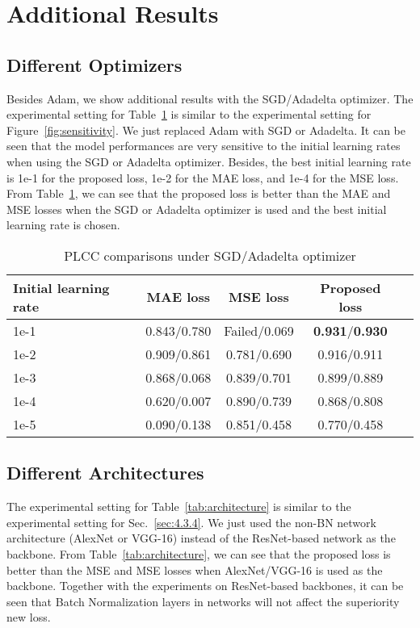\documentclass[sigconf]{acmart}
\begin{document}
\section{Additional Results}

\subsection{Different Optimizers}
Besides Adam, we show additional results with the SGD/Adadelta optimizer.
The experimental setting for Table~\ref{tab:optimizer} is similar to the experimental setting for Figure~\ref{fig:sensitivity}. We just replaced Adam with SGD or Adadelta. It can be seen that the model performances are very sensitive to the initial learning rates when using the SGD or Adadelta optimizer. Besides, the best initial learning rate is 1e-1 for the proposed loss, 1e-2 for the MAE loss, and 1e-4 for the MSE loss.
From Table~\ref{tab:optimizer}, we can see that the proposed loss is better than the MAE and MSE losses when the SGD or Adadelta optimizer is used and the best initial learning rate is chosen. 

\begin{table}[!htb]
\centering
\caption{PLCC comparisons under SGD/Adadelta optimizer}
\label{tab:optimizer}
\begin{tabular}{lcccc}  
\toprule
Initial learning rate & MAE loss & MSE loss & Proposed loss \\
\midrule
1e-1 & 0.843/0.780 & Failed/0.069 & \textbf{0.931}/\textbf{0.930} \\
1e-2 & 0.909/0.861 & 0.781/0.690 & 0.916/0.911 \\
1e-3 & 0.868/0.068 & 0.839/0.701 & 0.899/0.889 \\
1e-4 & 0.620/0.007 & 0.890/0.739 & 0.868/0.808 \\
1e-5 & 0.090/0.138 & 0.851/0.458 & 0.770/0.458 \\
\bottomrule
\end{tabular}
\end{table}

\subsection{Different Architectures}
\label{sec:supp_e}
The experimental setting for Table~\ref{tab:architecture} is similar to the experimental setting for Sec.~\ref{sec:4.3.4}. We just used the non-BN network architecture (AlexNet or VGG-16) instead of the ResNet-based network as the backbone. 
From Table~\ref{tab:architecture}, we can see that the proposed loss is better than the MSE and MSE losses when AlexNet/VGG-16 is used as the backbone. 
Together with the experiments on ResNet-based backbones, it can be seen that Batch Normalization layers in networks will not affect the superiority new loss.
\end{document}
